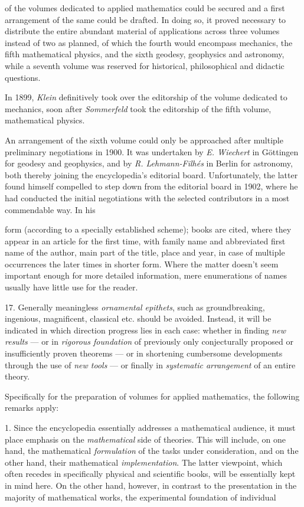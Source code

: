 \thispagestyle{fancy}

\vspace{0.5cm}

of the volumes dedicated to applied mathematics could be secured and a first arrangement of the same could be drafted. In doing so, it proved necessary to distribute the entire abundant material of applications across three volumes instead of two as planned, of which the fourth would encompass mechanics, the fifth mathematical physics, and the sixth geodesy, geophysics and astronomy, while a seventh volume was reserved for historical, philosophical and didactic questions.

In 1899, \textit{Klein} definitively took over the editorship of the volume dedicated to mechanics, soon after \textit{Sommerfeld} took the editorship of the fifth volume, mathematical physics.

An arrangement of the sixth volume could only be approached after multiple preliminary negotiations in 1900. It was undertaken by \textit{E. Wiechert} in Göttingen for geodesy and geophysics, and by \textit{R. Lehmann-Filhés} in Berlin for astronomy, both thereby joining the encyclopedia's editorial board. Unfortunately, the latter found himself compelled to step down from the editorial board in 1902, where he had conducted the initial negotiations with the selected contributors in a most commendable way. In his

\vfill
\leftline{\rule{2in}{0.4pt}}
{\footnotesize 

form (according to a specially established scheme); books are cited, where they appear in an article for the first time, with family name and abbreviated first name of the author, main part of the title, place and year, in case of multiple occurrences the later times in shorter form. Where the matter doesn't seem important enough for more detailed information, mere enumerations of names usually have little use for the reader.

17. Generally meaningless \textit{ornamental epithets}, such as groundbreaking, ingenious, magnificent, classical etc. should be avoided. Instead, it will be indicated in which direction progress lies in each case: whether in finding \textit{new results} — or in \textit{rigorous foundation} of previously only conjecturally proposed or insufficiently proven theorems — or in shortening cumbersome developments through the use of \textit{new tools} — or finally in \textit{systematic arrangement} of an entire theory.

Specifically for the preparation of volumes for applied mathematics, the following remarks apply:

1. Since the encyclopedia essentially addresses a mathematical audience, it must place emphasis on the \textit{mathematical} side of theories. This will include, on one hand, the mathematical \textit{formulation} of the tasks under consideration, and on the other hand, their mathematical \textit{implementation}. The latter viewpoint, which often recedes in specifically physical and scientific books, will be essentially kept in mind here. On the other hand, however, in contrast to the presentation in the majority of mathematical works, the experimental foundation of individual

}
